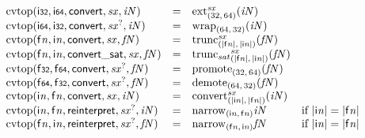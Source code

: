 $$
\begin{array}{@{}lcl@{}l@{}}
{\mathrm{cvtop}}(\mathsf{i{\scriptstyle32}}, \mathsf{i{\scriptstyle64}}, \mathsf{convert}, {\mathit{sx}}, {\mathit{iN}}) &=& {{{{\mathrm{ext}}}_{(32,\, 64)}^{{\mathit{sx}}}}}{({\mathit{iN}})} &  \\
{\mathrm{cvtop}}(\mathsf{i{\scriptstyle64}}, \mathsf{i{\scriptstyle32}}, \mathsf{convert}, {{\mathit{sx}}^?}, {\mathit{iN}}) &=& {{{\mathrm{wrap}}}_{(64,\, 32)}}{({\mathit{iN}})} &  \\
{\mathrm{cvtop}}({\mathsf{f}}{{\mathit{n}}}, {\mathsf{i}}{{\mathit{n}}}, \mathsf{convert}, {\mathit{sx}}, {\mathit{fN}}) &=& {{{{\mathrm{trunc}}}_{({|{\mathsf{f}}{{\mathit{n}}}|},\, {|{\mathsf{i}}{{\mathit{n}}}|})}^{{\mathit{sx}}}}}{({\mathit{fN}})} &  \\
{\mathrm{cvtop}}({\mathsf{f}}{{\mathit{n}}}, {\mathsf{i}}{{\mathit{n}}}, \mathsf{convert\_sat}, {\mathit{sx}}, {\mathit{fN}}) &=& {{{{\mathrm{trunc}}_{{\mathit{sat}}}}_{({|{\mathsf{f}}{{\mathit{n}}}|},\, {|{\mathsf{i}}{{\mathit{n}}}|})}^{{\mathit{sx}}}}}{({\mathit{fN}})} &  \\
{\mathrm{cvtop}}(\mathsf{f{\scriptstyle32}}, \mathsf{f{\scriptstyle64}}, \mathsf{convert}, {{\mathit{sx}}^?}, {\mathit{fN}}) &=& {{{\mathrm{promote}}}_{(32,\, 64)}}{({\mathit{fN}})} &  \\
{\mathrm{cvtop}}(\mathsf{f{\scriptstyle64}}, \mathsf{f{\scriptstyle32}}, \mathsf{convert}, {{\mathit{sx}}^?}, {\mathit{fN}}) &=& {{{\mathrm{demote}}}_{(64,\, 32)}}{({\mathit{fN}})} &  \\
{\mathrm{cvtop}}({\mathsf{i}}{{\mathit{n}}}, {\mathsf{f}}{{\mathit{n}}}, \mathsf{convert}, {\mathit{sx}}, {\mathit{iN}}) &=& {{{{\mathrm{convert}}}_{({|{\mathsf{i}}{{\mathit{n}}}|},\, {|{\mathsf{f}}{{\mathit{n}}}|})}^{{\mathit{sx}}}}}{({\mathit{iN}})} &  \\
{\mathrm{cvtop}}({\mathsf{i}}{{\mathit{n}}}, {\mathsf{f}}{{\mathit{n}}}, \mathsf{reinterpret}, {{\mathit{sx}}^?}, {\mathit{iN}}) &=& {{{\mathrm{narrow}}}_{({\mathsf{i}}{{\mathit{n}}},\, {\mathsf{f}}{{\mathit{n}}})}}{{\mathit{iN}}} &\quad
  \mbox{if}~{|{\mathsf{i}}{{\mathit{n}}}|} = {|{\mathsf{f}}{{\mathit{n}}}|} \\
{\mathrm{cvtop}}({\mathsf{f}}{{\mathit{n}}}, {\mathsf{i}}{{\mathit{n}}}, \mathsf{reinterpret}, {{\mathit{sx}}^?}, {\mathit{fN}}) &=& {{{\mathrm{narrow}}}_{({\mathsf{f}}{{\mathit{n}}},\, {\mathsf{i}}{{\mathit{n}}})}}{{\mathit{fN}}} &\quad
  \mbox{if}~{|{\mathsf{i}}{{\mathit{n}}}|} = {|{\mathsf{f}}{{\mathit{n}}}|} \\
\end{array}
$$

